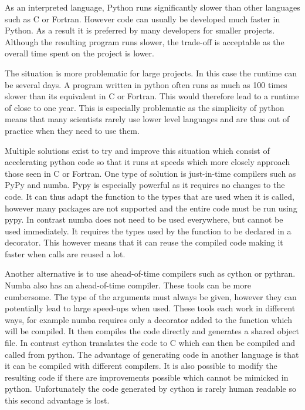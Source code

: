 
As an interpreted language, Python runs significantly slower than other languages such as C or Fortran. However code can usually be developed much faster in Python. As a result it is preferred by many developers for smaller projects. Although the resulting program runs slower, the trade-off is acceptable as the overall time spent on the project is lower.

The situation is more problematic for large projects. In this case the runtime can be several days. A program written in python often runs as much as 100 times slower than its equivalent in C or Fortran. This would therefore lead to a runtime of close to one year. This is especially problematic as the simplicity of python means that many scientists rarely use lower level languages and are thus out of practice when they need to use them.

Multiple solutions exist to try and improve this situation which consist of accelerating python code so that it runs at speeds which more closely approach those seen in C or Fortran. One type of solution is just-in-time compilers such as PyPy and numba. Pypy is especially powerful as it requires no changes to the code. It can thus adapt the function to the types that are used when it is called, however many packages are not supported and the entire code must be run using pypy. In contrast numba does not need to be used everywhere, but cannot be used immediately. It requires the types used by the function to be declared in a decorator. This however means that it can reuse the compiled code making it faster when calls are reused a lot.

Another alternative is to use ahead-of-time compilers such as cython or pythran. Numba also has an ahead-of-time compiler. These tools can be more cumbersome. The type of the arguments must always be given, however they can potentially lead to large speed-ups when used. These tools each work in different ways, for example numba requires only a decorator added to the function which will be compiled. It then compiles the code directly and generates a shared object file. In contrast cython translates the code to C which can then be compiled and called from python. The advantage of generating code in another language is that it can be compiled with different compilers. It is also possible to modify the resulting code if there are improvements possible which cannot be mimicked in python. Unfortunately the code generated by cython is rarely human readable so this second advantage is lost.


